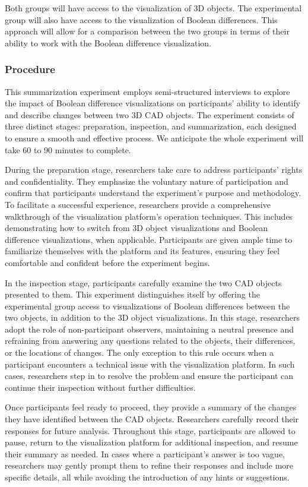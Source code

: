 \documentclass[sigconf,authorversion,nonacm]{acmart}
\begin{document}
Both groups will have access to the visualization of 3D objects. The experimental group will also have access to the visualization of Boolean differences. This approach will allow for a comparison between the two groups in terms of their ability to work with the Boolean difference visualization.
\subsubsection{Procedure}
This summarization experiment employs semi-structured interviews to explore the impact of Boolean difference visualizations on participants' ability to identify and describe changes between two 3D CAD objects.
The experiment consists of three distinct stages: preparation, inspection, and summarization, each designed to ensure a smooth and effective process. We anticipate the whole experiment will take 60 to 90 minutes to complete.

During the preparation stage, researchers take care to address participants' rights and confidentiality. They emphasize the voluntary nature of participation and confirm that participants understand the experiment's purpose and methodology.
To facilitate a successful experience, researchers provide a comprehensive walkthrough of the visualization platform's operation techniques. This includes demonstrating how to switch from 3D object visualizations and Boolean difference visualizations, when applicable.
Participants are given ample time to familiarize themselves with the platform and its features, ensuring they feel comfortable and confident before the experiment begins.

In the inspection stage, participants carefully examine the two CAD objects presented to them. This experiment distinguishes itself by offering the experimental group access to visualizations of Boolean differences between the two objects, in addition to the 3D object visualizations. 
In this stage, researchers adopt the role of non-participant observers, maintaining a neutral presence and refraining from answering any questions related to the objects, their differences, or the locations of changes.
The only exception to this rule occurs when a participant encounters a technical issue with the visualization platform.
In such cases, researchers step in to resolve the problem and ensure the participant can continue their inspection without further difficulties.

Once participants feel ready to proceed, they provide a summary of the changes they have identified between the CAD objects. Researchers carefully record their responses for future analysis.
Throughout this stage, participants are allowed to pause, return to the visualization platform for additional inspection, and resume their summary as needed. In cases where a participant's answer is too vague,
researchers may gently prompt them to refine their responses and include more specific details, all while avoiding the introduction of any hints or suggestions.
\end{document}
